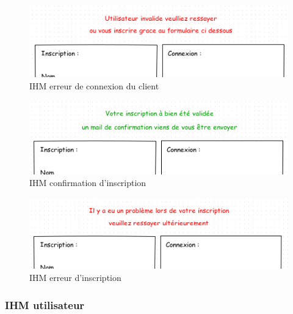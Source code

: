 \documentclass[a4paper,11pt]{article}
\begin{document}
\begin{figure}[H]
  \begin{center}
    \includegraphics[width=15cm]{../../IHM/IHM_connection_utilisateur_erreur_co_z.png}
    \caption{IHM erreur de connexion du client}
  \end{center}
\end{figure}

\begin{figure}[H]
  \begin{center}
    \includegraphics[width=15cm]{../../IHM/IHM_connection_utilisateur_conf_ins_z.png}
    \caption{IHM confirmation d'inscription}
  \end{center}
\end{figure}

\begin{figure}[H]
  \begin{center}
    \includegraphics[width=15cm]{../../IHM/IHM_connection_utilisateur_erreur_ins_z.png}
    \caption{IHM erreur d'inscription}
  \end{center}
\end{figure}

\pagebreak
\subsubsection{IHM utilisateur}
\end{document}

